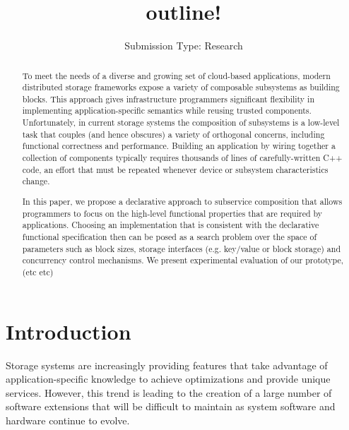 \documentclass[10pt,twocolumn]{article}
\begin{document}
\title{outline!}

\author{
\small Submission Type: Research
}

\date{}
\maketitle

\begin{abstract}
To meet the needs of a diverse and growing set of cloud-based applications,
modern distributed storage frameworks expose a variety of composable
subsystems as building blocks.  This approach gives infrastructure programmers
significant flexibility in implementing application-specific semantics while
reusing trusted components.  Unfortunately, in current storage systems the
composition of subsystems is a low-level task that couples (and hence
obscures) a variety of orthogonal concerns, including functional correctness
and performance.  Building an application by wiring together a collection of
components typically requires thousands of lines of carefully-written C++
code, an effort that must be repeated whenever device or subsystem
characteristics change.

In this paper, we propose a declarative approach to subservice composition
that allows programmers to focus on the high-level functional properties that
are required by applications.  Choosing an implementation that is consistent
with the declarative functional specification then can be posed as a search
problem over the space of parameters such as block sizes, storage interfaces
(e.g. key/value or block storage) and concurrency control mechanisms.  We
present experimental evaluation of our prototype, (etc etc)
\end{abstract}

\section{Introduction}

Storage systems are increasingly providing features that take advantage of
application-specific knowledge to achieve optimizations and provide unique
services. However, this trend is leading to the creation of a large number of
software extensions that will be difficult to maintain as system software and
hardware continue to evolve.
\end{document}
